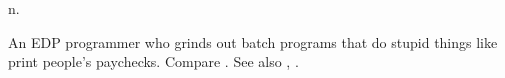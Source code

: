  n.

An EDP programmer who grinds out batch programs that do stupid things like print
people's paychecks. Compare . See also
, .

